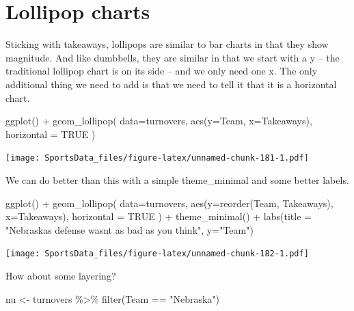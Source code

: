 \documentclass[
]{book}
\newenvironment{Shaded}{\begin{snugshade}}{\end{snugshade}}
\newcommand{\AttributeTok}[1]{\textcolor[rgb]{0.77,0.63,0.00}{#1}}
\newcommand{\ConstantTok}[1]{\textcolor[rgb]{0.00,0.00,0.00}{#1}}
\newcommand{\FunctionTok}[1]{\textcolor[rgb]{0.00,0.00,0.00}{#1}}
\newcommand{\NormalTok}[1]{#1}
\newcommand{\OtherTok}[1]{\textcolor[rgb]{0.56,0.35,0.01}{#1}}
\newcommand{\SpecialCharTok}[1]{\textcolor[rgb]{0.00,0.00,0.00}{#1}}
\newcommand{\StringTok}[1]{\textcolor[rgb]{0.31,0.60,0.02}{#1}}
\begin{document}
\hypertarget{lollipop-charts}{%
\section{Lollipop charts}\label{lollipop-charts}}

Sticking with takeaways, lollipops are similar to bar charts in that they show magnitude. And like dumbbells, they are similar in that we start with a y -- the traditional lollipop chart is on its side -- and we only need one x. The only additional thing we need to add is that we need to tell it that it is a horizontal chart.

\begin{Shaded}
\begin{Highlighting}[]
\FunctionTok{ggplot}\NormalTok{() }\SpecialCharTok{+} 
  \FunctionTok{geom\_lollipop}\NormalTok{(}
    \AttributeTok{data=}\NormalTok{turnovers, }
    \FunctionTok{aes}\NormalTok{(}\AttributeTok{y=}\NormalTok{Team, }\AttributeTok{x=}\NormalTok{Takeaways), }
    \AttributeTok{horizontal =} \ConstantTok{TRUE}
\NormalTok{    )}
\end{Highlighting}
\end{Shaded}

\texttt{[image: SportsData\_files/figure-latex/unnamed-chunk-181-1.pdf]}

We can do better than this with a simple theme\_minimal and some better labels.

\begin{Shaded}
\begin{Highlighting}[]
\FunctionTok{ggplot}\NormalTok{() }\SpecialCharTok{+} 
  \FunctionTok{geom\_lollipop}\NormalTok{(}
    \AttributeTok{data=}\NormalTok{turnovers, }
    \FunctionTok{aes}\NormalTok{(}\AttributeTok{y=}\FunctionTok{reorder}\NormalTok{(Team, Takeaways), }\AttributeTok{x=}\NormalTok{Takeaways), }
    \AttributeTok{horizontal =} \ConstantTok{TRUE}
\NormalTok{    ) }\SpecialCharTok{+} \FunctionTok{theme\_minimal}\NormalTok{() }\SpecialCharTok{+} 
  \FunctionTok{labs}\NormalTok{(}\AttributeTok{title =} \StringTok{"Nebraska\textquotesingle{}s defense wasn\textquotesingle{}t as bad as you think"}\NormalTok{, }\AttributeTok{y=}\StringTok{"Team"}\NormalTok{)}
\end{Highlighting}
\end{Shaded}

\texttt{[image: SportsData\_files/figure-latex/unnamed-chunk-182-1.pdf]}

How about some layering?

\begin{Shaded}
\begin{Highlighting}[]
\NormalTok{nu }\OtherTok{\textless{}{-}}\NormalTok{ turnovers }\SpecialCharTok{\%\textgreater{}\%} \FunctionTok{filter}\NormalTok{(Team }\SpecialCharTok{==} \StringTok{"Nebraska"}\NormalTok{)}
\end{Highlighting}
\end{Shaded}
\end{document}
